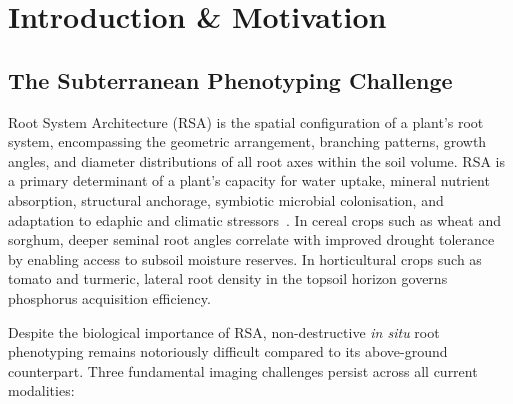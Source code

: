 \documentclass[final,3p,times,nonatbib]{elsarticle}
\begin{document}
\section{Introduction \& Motivation}
\label{sec:intro}

\subsection{The Subterranean Phenotyping Challenge}
Root System Architecture (RSA) is the spatial configuration of a plant's root system, encompassing the geometric arrangement, branching patterns, growth angles, and diameter distributions of all root axes within the soil volume. RSA is a primary determinant of a plant's capacity for water uptake, mineral nutrient absorption, structural anchorage, symbiotic microbial colonisation, and adaptation to edaphic and climatic stressors~\cite{rootnav2019}. In cereal crops such as wheat and sorghum, deeper seminal root angles correlate with improved drought tolerance by enabling access to subsoil moisture reserves. In horticultural crops such as tomato and turmeric, lateral root density in the topsoil horizon governs phosphorus acquisition efficiency.

Despite the biological importance of RSA, non-destructive \textit{in situ} root phenotyping remains notoriously difficult compared to its above-ground counterpart. Three fundamental imaging challenges persist across all current modalities:
\end{document}

